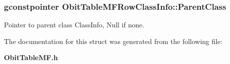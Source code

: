 \subsubsection{\setlength{\rightskip}{0pt plus 5cm}gconstpointer {\bf Obit\-Table\-MFRow\-Class\-Info::Parent\-Class}}\label{structObitTableMFRowClassInfo_o3}


Pointer to parent class Class\-Info, Null if none. 



The documentation for this struct was generated from the following file:\begin{CompactItemize}
\item 
{\bf Obit\-Table\-MF.h}\end{CompactItemize}
